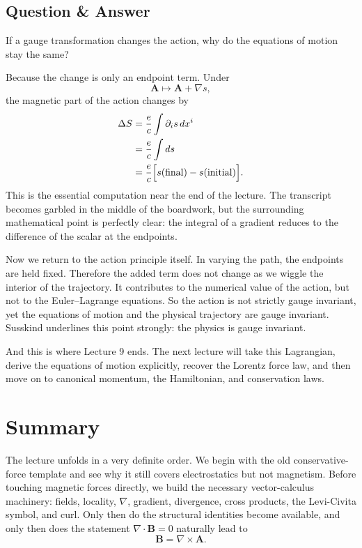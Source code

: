\subsection{Question \& Answer}

If a gauge transformation changes the action, why do the equations of motion stay the same?

Because the change is only an endpoint term. Under
\[
\mathbf A\mapsto \mathbf A+\nabla s,
\]
the magnetic part of the action changes by
\begin{align}
\Delta S
&=\frac{e}{c}\int \partial_i s\,dx^i\\
&=\frac{e}{c}\int ds\\
&=\frac{e}{c}\Bigl[s(\mathrm{final})-s(\mathrm{initial})\Bigr].
\end{align}
This is the essential computation near the end of the lecture. The transcript becomes garbled in the middle of the boardwork, but the surrounding mathematical point is perfectly clear: the integral of a gradient reduces to the difference of the scalar at the endpoints.

Now we return to the action principle itself. In varying the path, the endpoints are held fixed. Therefore the added term does not change as we wiggle the interior of the trajectory. It contributes to the numerical value of the action, but not to the Euler--Lagrange equations. So the action is not strictly gauge invariant, yet the equations of motion and the physical trajectory are gauge invariant. Susskind underlines this point strongly: the physics is gauge invariant.

And this is where Lecture 9 ends. The next lecture will take this Lagrangian, derive the equations of motion explicitly, recover the Lorentz force law, and then move on to canonical momentum, the Hamiltonian, and conservation laws.

\section{Summary}

The lecture unfolds in a very definite order. We begin with the old conservative-force template and see why it still covers electrostatics but not magnetism. Before touching magnetic forces directly, we build the necessary vector-calculus machinery: fields, locality, \(\nabla\), gradient, divergence, cross products, the Levi-Civita symbol, and curl. Only then do the structural identities become available, and only then does the statement \(\nabla\cdot\mathbf B=0\) naturally lead to
\[
\mathbf B=\nabla\times\mathbf A.
\]

